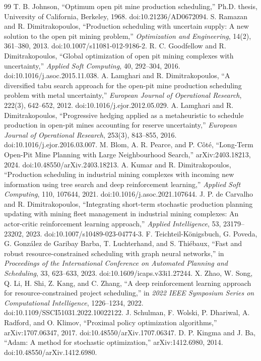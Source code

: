 \documentclass[11pt]{article}
\begin{document}
\begin{thebibliography}{99}
 T. B. Johnson, ``Optimum open pit mine production scheduling,'' Ph.D. thesis, University of California, Berkeley, 1968. doi:10.21236/AD0672094.
 S. Ramazan and R. Dimitrakopoulos, ``Production scheduling with uncertain supply: A new solution to the open pit mining problem,'' \emph{Optimization and Engineering}, 14(2), 361--380, 2013. doi:10.1007/s11081-012-9186-2.
 R. C. Goodfellow and R. Dimitrakopoulos, ``Global optimization of open pit mining complexes with uncertainty,'' \emph{Applied Soft Computing}, 40, 292--304, 2016. doi:10.1016/j.asoc.2015.11.038.
 A. Lamghari and R. Dimitrakopoulos, ``A diversified tabu search approach for the open-pit mine production scheduling problem with metal uncertainty,'' \emph{European Journal of Operational Research}, 222(3), 642--652, 2012. doi:10.1016/j.ejor.2012.05.029.
 A. Lamghari and R. Dimitrakopoulos, ``Progressive hedging applied as a metaheuristic to schedule production in open-pit mines accounting for reserve uncertainty,'' \emph{European Journal of Operational Research}, 253(3), 843--855, 2016. doi:10.1016/j.ejor.2016.03.007.
 M. Blom, A. R. Pearce, and P. C\^ot\'e, ``Long-Term Open-Pit Mine Planning with Large Neighbourhood Search,'' arXiv:2403.18213, 2024. doi:10.48550/arXiv.2403.18213.
 A. Kumar and R. Dimitrakopoulos, ``Production scheduling in industrial mining complexes with incoming new information using tree search and deep reinforcement learning,'' \emph{Applied Soft Computing}, 110, 107644, 2021. doi:10.1016/j.asoc.2021.107644.
 J. P. de Carvalho and R. Dimitrakopoulos, ``Integrating short-term stochastic production planning updating with mining fleet management in industrial mining complexes: An actor-critic reinforcement learning approach,'' \emph{Applied Intelligence}, 53, 23179--23202, 2023. doi:10.1007/s10489-023-04774-3.
 F. Teichteil-K\"onigsbuch, G. Poveda, G. Gonz\'alez de Garibay Barba, T. Luchterhand, and S. Thi\'ebaux, ``Fast and robust resource-constrained scheduling with graph neural networks,'' in \emph{Proceedings of the International Conference on Automated Planning and Scheduling}, 33, 623--633, 2023. doi:10.1609/icaps.v33i1.27244.
 X. Zhao, W. Song, Q. Li, H. Shi, Z. Kang, and C. Zhang, ``A deep reinforcement learning approach for resource-constrained project scheduling,'' in \emph{2022 IEEE Symposium Series on Computational Intelligence}, 1226--1234, 2022. doi:10.1109/SSCI51031.2022.10022122.
 J. Schulman, F. Wolski, P. Dhariwal, A. Radford, and O. Klimov, ``Proximal policy optimization algorithms,'' arXiv:1707.06347, 2017. doi:10.48550/arXiv.1707.06347.
 D. P. Kingma and J. Ba, ``Adam: A method for stochastic optimization,'' arXiv:1412.6980, 2014. doi:10.48550/arXiv.1412.6980.
\end{thebibliography}
\end{document}
